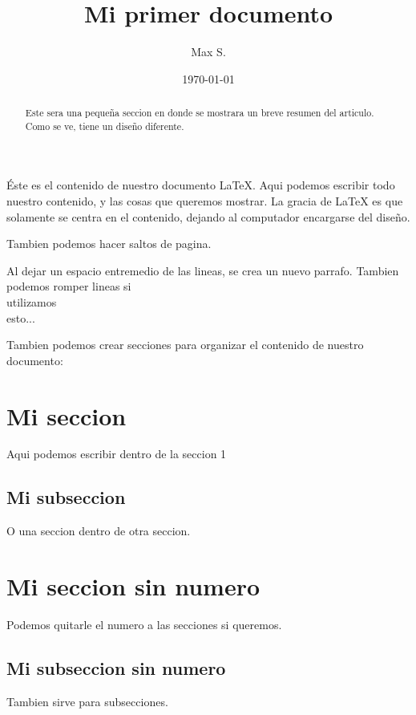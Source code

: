 \documentclass[12pt]{article}
\title{Mi primer documento}
\author{Max S.}
\date{\today}
\begin{document}
    \begin{titlepage}
        \maketitle
    \end{titlepage}

    \begin{abstract}
        Este sera una pequeña seccion en donde se mostrara un breve resumen del
        articulo. Como se ve, tiene un diseño diferente.
    \end{abstract}

    Éste es el contenido de nuestro documento \LaTeX. Aqui podemos escribir
    todo nuestro contenido, y las cosas que queremos mostrar. La gracia de \LaTeX
    es que solamente se centra en el contenido, dejando al computador encargarse
    del diseño.

    Tambien podemos hacer saltos de pagina.

    \newpage

    Al dejar un espacio entremedio de las lineas, se crea un nuevo parrafo.
    Tambien podemos romper lineas si \\ utilizamos \\ esto...

    Tambien podemos crear secciones para organizar el contenido de nuestro
    documento:

    \section{Mi seccion}

        Aqui podemos escribir dentro de la seccion 1

        \subsection{Mi subseccion}

        O una seccion dentro de otra seccion.

    \section*{Mi seccion sin numero}

        Podemos quitarle el numero a las secciones si queremos.

        \subsection*{Mi subseccion sin numero}

        Tambien sirve para subsecciones.
\end{document}
